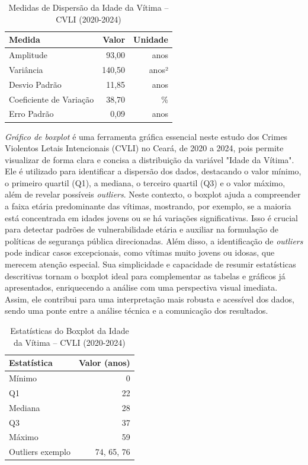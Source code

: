 \documentclass{exam}
\begin{document}
\begin{questions}
\begin{table}[H]
    \centering
    \begin{tabular}{lrr}
        \toprule
        \textbf{Medida} & \textbf{Valor} & \textbf{Unidade} \\ 
        \midrule
        Amplitude & 93,00 & anos \\ 
        Variância & 140,50 & anos² \\ 
        Desvio Padrão & 11,85 & anos \\ 
        Coeficiente de Variação & 38,70 & \% \\ 
        Erro Padrão & 0,09 & anos \\ 
        \bottomrule
    \end{tabular}
    \caption{Medidas de Dispersão da Idade da Vítima -- CVLI (2020-2024)}
    \label{tab:medidas_dispersao_idade}
\end{table}

\question 
\textit{Gráfico de boxplot} é uma ferramenta gráfica essencial neste estudo dos Crimes Violentos Letais Intencionais (CVLI) no Ceará, de 2020 a 2024, pois permite visualizar de forma clara e concisa a distribuição da variável "Idade da Vítima". Ele é utilizado para identificar a dispersão dos dados, destacando o valor mínimo, o primeiro quartil (Q1), a mediana, o terceiro quartil (Q3) e o valor máximo, além de revelar possíveis \textit{outliers}. Neste contexto, o boxplot ajuda a compreender a faixa etária predominante das vítimas, mostrando, por exemplo, se a maioria está concentrada em idades jovens ou se há variações significativas. Isso é crucial para detectar padrões de vulnerabilidade etária e auxiliar na formulação de políticas de segurança pública direcionadas. Além disso, a identificação de \textit{outliers} pode indicar casos excepcionais, como vítimas muito jovens ou idosas, que merecem atenção especial. Sua simplicidade e capacidade de resumir estatísticas descritivas tornam o boxplot ideal para complementar as tabelas e gráficos já apresentados, enriquecendo a análise com uma perspectiva visual imediata. Assim, ele contribui para uma interpretação mais robusta e acessível dos dados, sendo uma ponte entre a análise técnica e a comunicação dos resultados.

\begin{table}[H]
    \centering
    \begin{tabular}{lr}
        \toprule
        \textbf{Estatística} & \textbf{Valor (anos)} \\ 
        \midrule
        Mínimo & 0 \\ 
        Q1 & 22 \\ 
        Mediana & 28 \\ 
        Q3 & 37 \\ 
        Máximo & 59 \\ 
        Outliers exemplo & 74, 65, 76 \\ 
        \bottomrule
    \end{tabular}
    \caption{Estatísticas do Boxplot da Idade da Vítima -- CVLI (2020-2024)}
    \label{tab:boxplot_idade}
\end{table}


\end{questions}
\end{document}
